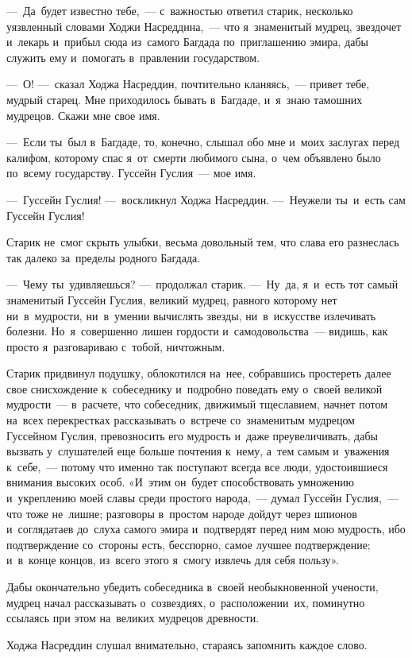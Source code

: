 \documentclass[12pt,a4paper]{book}
\begin{document}
—~Да~будет известно тебе,~— с~важностью ответил старик, несколько уязвленный словами Ходжи Насреддина,~— что я~знаменитый мудрец, звездочет и~лекарь и~прибыл сюда из~самого Багдада по~приглашению эмира, дабы служить ему и~помогать в~правлении государством.

—~О! —~сказал Ходжа Насреддин, почтительно кланяясь,~— привет тебе, мудрый старец. Мне приходилось бывать в~Багдаде, и~я~знаю тамошних мудрецов. Скажи мне свое имя.

—~Если ты~был в~Багдаде, то, конечно, слышал обо мне и~моих заслугах перед калифом, которому спас я~от~смерти любимого сына, о~чем объявлено было по~всему государству. Гуссейн Гуслия~— мое имя.

—~Гуссейн Гуслия! —~воскликнул Ходжа Насреддин. —~Неужели ты~и~есть сам Гуссейн Гуслия!

Старик не~смог скрыть улыбки, весьма довольный тем, что слава его разнеслась так далеко за~пределы родного Багдада.

—~Чему ты~удивляешься? —~продолжал старик. —~Ну~да, я~и~есть тот самый знаменитый Гуссейн Гуслия, великий мудрец, равного которому нет ни~в~мудрости, ни~в~умении вычислять звезды, ни~в~искусстве излечивать болезни. Но~я~совершенно лишен гордости и~самодовольства~— видишь, как просто я~разговариваю с~тобой, ничтожным.

Старик придвинул подушку, облокотился на~нее, собравшись простереть далее свое снисхождение к~собеседнику и~подробно поведать ему о~своей великой мудрости~— в~расчете, что собеседник, движимый тщеславием, начнет потом на~всех перекрестках рассказывать о~встрече со~знаменитым мудрецом Гуссейном Гуслия, превозносить его мудрость и~даже преувеличивать, дабы вызвать у~слушателей еще больше почтения к~нему, а~тем самым и~уважения к~себе,~— потому что именно так поступают всегда все люди, удостоившиеся внимания высоких особ. «И~этим он~будет способствовать умножению и~укреплению моей славы среди простого народа,~— думал Гуссейн Гуслия,~— что тоже не~лишне; разговоры в~простом народе дойдут через шпионов и~соглядатаев до~слуха самого эмира и~подтвердят перед ним мою мудрость, ибо подтверждение со~стороны есть, бесспорно, самое лучшее подтверждение; и~в~конце концов, из~всего этого я~смогу извлечь для себя пользу».

Дабы окончательно убедить собеседника в~своей необыкновенной учености, мудрец начал рассказывать о~созвездиях, о~расположении~их, поминутно ссылаясь при этом на~великих мудрецов древности.

Ходжа Насреддин слушал внимательно, стараясь запомнить каждое слово.
\end{document}

